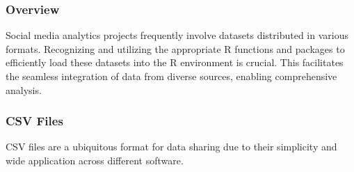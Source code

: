 \documentclass[
]{book}
\begin{document}
\hypertarget{overview-11}{%
\subsubsection{Overview}\label{overview-11}}

Social media analytics projects frequently involve datasets distributed in various formats. Recognizing and utilizing the appropriate R functions and packages to efficiently load these datasets into the R environment is crucial. This facilitates the seamless integration of data from diverse sources, enabling comprehensive analysis.

\hypertarget{csv-files}{%
\subsubsection{CSV Files}\label{csv-files}}

CSV files are a ubiquitous format for data sharing due to their simplicity and wide application across different software.
\end{document}
